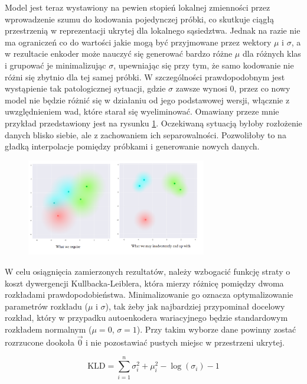 Model jest teraz wystawiony na pewien stopień lokalnej zmienności przez wprowadzenie szumu do kodowania pojedynczej próbki, co skutkuje ciągłą przestrzenią w reprezentacji ukrytej dla lokalnego sąsiedztwa. Jednak na razie nie ma ograniczeń co do wartości jakie mogą być przyjmowane przez wektory $\mu$ i $\sigma$, a w rezultacie enkoder może nauczyć się generować bardzo różne $\mu$ dla różnych klas i grupować je minimalizując $\sigma$, upewniając się przy tym, że samo kodowanie nie różni się zbytnio dla tej samej próbki. W szczególności prawdopodobnym jest wystąpienie tak patologicznej sytuacji, gdzie $\sigma$ zawsze wynosi 0, przez co nowy model nie będzie różnić się w działaniu od jego podstawowej wersji, włącznie z uwzględnieniem wad, które starał się wyeliminować. Omawiany przeze mnie przykład przedstawiony jest na rysunku \ref{fig:vae_nolimits}. Oczekiwaną sytuacją byłoby rozłożenie danych blisko siebie, ale z zachowaniem ich separowalności. Pozwoliłoby to na gładką interpolacje pomiędzy próbkami i generowanie nowych danych.

\begin{figure}[h!]
    \centering
    \includegraphics[width=0.7\textwidth]{images/vae_nolimits}
    \caption{}
    \label{fig:vae_nolimits}
\end{figure}

W celu osiągnięcia zamierzonych rezultatów, należy wzbogacić funkcję straty o koszt dywergencji Kullbacka-Leiblera, która mierzy różnicę pomiędzy dwoma rozkładami prawdopodobieństwa. Minimalizowanie go oznacza optymalizowanie parametrów rozkładu ($\mu$ i $\sigma$), tak żeby jak najbardziej przypominał docelowy rozkład, który w przypadku autoenkodera wariacyjnego będzie standardowym rozkładem normalnym ($\mu = 0$,  $\sigma = 1$).
Przy takim wyborze dane powinny zostać rozrzucone dookoła $\vec{0}$ i nie pozostawiać pustych miejsc w przestrzeni ukrytej.

\begin{equation}
\mathrm { KLD } = \sum _ { i = 1 } ^ { n } \sigma _ { i } ^ { 2 } + \mu _ { i } ^ { 2 } - \log \left( \sigma _ { i } \right) - 1
\end{equation}


